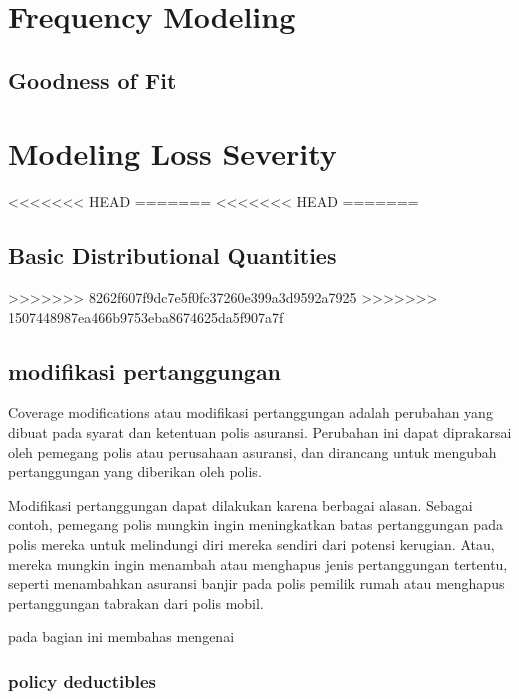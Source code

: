 \documentclass[
]{book}
\begin{document}
\hypertarget{frequency-modeling}{%
\chapter{Frequency Modeling}\label{frequency-modeling}}

\hypertarget{goodness-of-fit}{%
\section{Goodness of Fit}\label{goodness-of-fit}}

\hypertarget{modeling-loss-severity}{%
\chapter{Modeling Loss Severity}\label{modeling-loss-severity}}

<<<<<<< HEAD
=======
<<<<<<< HEAD
=======
\hypertarget{basic-distributional-quantities}{%
\section{Basic Distributional Quantities}\label{basic-distributional-quantities}}

>>>>>>> 8262f607f9dc7e5f0fc37260e399a3d9592a7925
>>>>>>> 1507448987ea466b9753eba8674625da5f907a7f
\hypertarget{modifikasi-pertanggungan}{%
\section{modifikasi pertanggungan}\label{modifikasi-pertanggungan}}

Coverage modifications atau modifikasi pertanggungan adalah perubahan yang dibuat pada syarat dan ketentuan polis asuransi. Perubahan ini dapat diprakarsai oleh pemegang polis atau perusahaan asuransi, dan dirancang untuk mengubah pertanggungan yang diberikan oleh polis.

Modifikasi pertanggungan dapat dilakukan karena berbagai alasan. Sebagai contoh, pemegang polis mungkin ingin meningkatkan batas pertanggungan pada polis mereka untuk melindungi diri mereka sendiri dari potensi kerugian. Atau, mereka mungkin ingin menambah atau menghapus jenis pertanggungan tertentu, seperti menambahkan asuransi banjir pada polis pemilik rumah atau menghapus pertanggungan tabrakan dari polis mobil.

pada bagian ini membahas mengenai

\hypertarget{policy-deductibles}{%
\subsection{policy deductibles}\label{policy-deductibles}}
\end{document}
